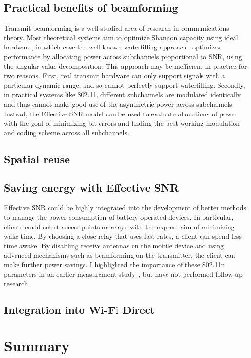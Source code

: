 \subsection{Practical benefits of beamforming}
Transmit beamforming is a well-studied area of research in communications theory. Most theoretical systems aim to optimize Shannon capacity using ideal hardware, in which case the well known waterfilling approach~\cite[p. 183]{Tse} optimizes performance by allocating power across subchannels proportional to SNR, using the singular value decomposition. This approach may be inefficient in practice for two reasons. First, real transmit hardware can only support signals with a particular dynamic range, and so cannot perfectly support waterfilling. Secondly, in practical systems like 802.11, different subchannels are modulated identically and thus cannot make good use of the asymmetric power across subchannels. Instead, the Effective SNR model can be used to evaluate allocations of power with the goal of minimizing bit errors and finding the best working modulation and coding scheme across all subchannels.

\subsection{Spatial reuse}


\subsection{Saving energy with Effective SNR}
Effective SNR could be highly integrated into the development of better methods to manage the power consumption of battery-operated devices. In particular, clients could select access points or relays with the express aim of minimizing wake time. By choosing a close relay that uses fast rates, a client can spend less time awake. By disabling receive antennas on the mobile device and using advanced mechanisms such as beamforming on the transmitter, the client can make further power savings. I highlighted the importance of these 802.11n parameters in an earlier measurement study~\cite{Halperin_Power}, but have not performed follow-up research.

\subsection{Integration into Wi-Fi Direct}

\section{Summary}

\ifx\mainfile\undefined

\fi

